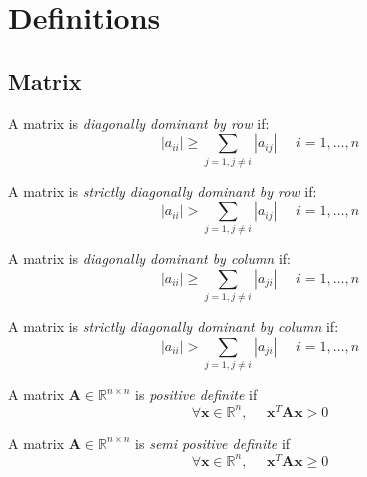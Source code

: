\documentclass[12pt, a4paper]{report}
\newtheorem[style=M,bodystyle=\normalfont]{theorem}{Theorem}
\newtheorem[style=M,bodystyle=\normalfont]{proposition}{Proposition}
\newtheorem[style=M,bodystyle=\normalfont]{corollary}{Corollary}
\newtheorem[style=M,bodystyle=\normalfont]{lemma}{Lemma}
\newtheorem[style=M,bodystyle=\normalfont]{definition}{Definition}
\begin{document}
\newpage

\chapter{Definitions}
    \section{Matrix}
    \begin{definition}
        A matrix is \emph{diagonally dominant by row} if: 
        \[\left\lvert a_{ii} \right\rvert \geq \sum_{j=1,j \neq i}{\left\lvert a_{ij} \right\rvert} \:\:\:\:\:\: i=1,\dots,n\]

        A matrix is \emph{strictly diagonally dominant by row} if: 
        \[\left\lvert a_{ii} \right\rvert > \sum_{j=1,j \neq i}{\left\lvert a_{ij} \right\rvert} \:\:\:\:\:\: i=1,\dots,n\]

        A matrix is \emph{diagonally dominant by column} if: 
        \[\left\lvert a_{ii} \right\rvert \geq \sum_{j=1,j \neq i}{\left\lvert a_{ji} \right\rvert} \:\:\:\:\:\: i=1,\dots,n \]

        A matrix is \emph{strictly diagonally dominant by column} if: 
        \[\left\lvert a_{ii} \right\rvert > \sum_{j=1,j \neq i}{\left\lvert a_{ji} \right\rvert} \:\:\:\:\:\: i=1,\dots,n \]

        A matrix $\boldsymbol{A} \in \mathbb{R}^{n \times n}$ is \emph{positive definite} if 
        \[\forall\boldsymbol{x} \in \mathbb{R}^{n}, \:\:\:\:\:\: \boldsymbol{x}^T \boldsymbol{Ax}>0\]

        A matrix $\boldsymbol{A} \in \mathbb{R}^{n \times n}$ is \emph{semi positive definite} if 
        \[\forall\boldsymbol{x} \in \mathbb{R}^{n}, \:\:\:\:\:\: \boldsymbol{x}^T \boldsymbol{Ax} \geq 0\]
    \end{definition}
\end{document}
